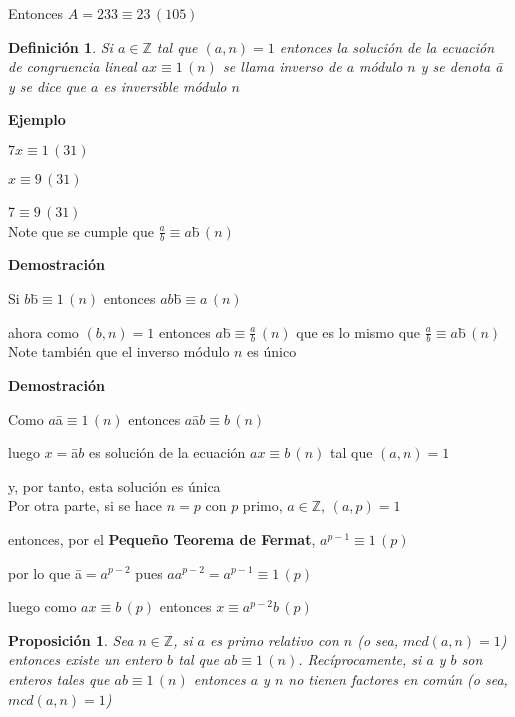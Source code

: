 \documentclass[a4paper,12pt]{report}
\newtheorem*{dfn}{Definición}
\newtheorem*{pro}{Proposición}
\begin{document}
Entonces $A=233\equiv 23 \, (105)$


\begin{dfn}
 Si $a\in\mathbb{Z}$ tal que $(a,n)=1$ entonces la solución de la ecuación de congruencia lineal $ax\equiv 1 \, (n)$ se llama inverso de $a$ módulo $n$ y se denota  \={a}  y se dice que $a$ es inversible módulo $n$
\end{dfn}

\textbf{Ejemplo}

$7x\equiv 1\, (31)$

$x\equiv 9\, (31)$

\={7}$\equiv 9\, (31)$\\



Note que se cumple que $\frac{a}{b}\equiv a$\={b}$\, (n)$

\textbf{Demostración}

Si $b$\={b}$\equiv 1 \, (n)$ entonces $ab$\={b}$\equiv a \, (n)$

ahora como $(b,n)=1$ entonces $a$\={b}$\equiv \frac{a}{b} \, (n)$ que es lo mismo que $\frac{a}{b}\equiv a$\={b}$  \, (n)$\\


Note también que el inverso módulo $n$ es único 

\textbf{Demostración}

Como $a$\={a}$\equiv 1 \, (n)$  entonces  $a$\={a}$b\equiv b \, (n)$

luego $x=$\={a}$b$ es solución de la ecuación $ax\equiv b \, (n)$ tal que $(a,n)=1$ 

y, por tanto, esta solución es única\\

Por otra parte, si se hace $n=p$ con $p$ primo, $a\in\mathbb{Z}$, $(a,p)=1$

entonces, por el \textbf{Pequeño Teorema de Fermat}, $a^{p-1}\equiv 1 \, (p)$

por lo que \={a}$=a^{p-2}$ pues $aa^{p-2}=a^{p-1}\equiv 1 \, (p)$ 

luego como $ax\equiv b \, (p)$ entonces $x\equiv a^{p-2}b \, (p)$

 \begin{pro}
  Sea $n\in \mathbb{Z}$, si $a$ es primo relativo con $n$ (o sea, $mcd(a,n)=1$) entonces existe un entero $b$ tal que $ab \equiv 1\, (n)$.
  Recíprocamente, si $a$ y $b$ son enteros tales que $ab \equiv 1 \, (n)$ entonces $a$ y $n$ no tienen factores en común (o sea, $mcd(a,n)=1$)
 \end{pro}
 
\end{document}
